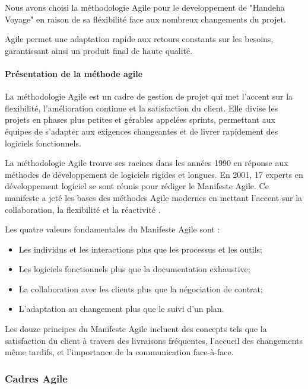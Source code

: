 \documentclass[12pt]{report}
\begin{document}
				Nous avons choisi la méthodologie Agile pour le developpement de "Handeha Voyage" en raison de sa fléxibilité face aux nombreux changements du projet.
				
				Agile permet une adaptation rapide aux retours constants sur les besoins, garantissant ainsi un produit final de haute qualité.				

				\paragraph{Présentation de la méthode agile}

				La méthodologie Agile est un cadre de gestion de projet qui met l'accent sur la flexibilité, l'amélioration continue et la satisfaction du client. Elle divise les projets en phases plus petites et gérables appelées sprints, permettant aux équipes de s'adapter aux exigences changeantes et de livrer rapidement des logiciels fonctionnels.
	
				La méthodologie Agile trouve ses racines dans les années 1990 en réponse aux méthodes de développement de logiciels rigides et longues. En 2001, 17 experts en développement logiciel se sont réunis pour rédiger le Manifeste Agile. Ce manifeste a jeté les bases des méthodes Agile modernes en mettant l'accent sur la collaboration, la flexibilité et la réactivité \cite{Asana}.

				Les quatre valeurs fondamentales du Manifeste Agile sont :

				\begin{itemize}
					\item Les individus et les interactions plus que les processus et les outils;
					\item Les logiciels fonctionnels plus que la documentation exhaustive;
					\item La collaboration avec les clients plus que la négociation de contrat;
					\item L'adaptation au changement plus que le suivi d'un plan.
				\end{itemize}

				Les douze principes du Manifeste Agile incluent des concepts tels que la satisfaction du client à travers des livraisons fréquentes, l'accueil des changements même tardifs, et l'importance de la communication face-à-face.

				\subsubsection{Cadres Agile}
\end{document}
